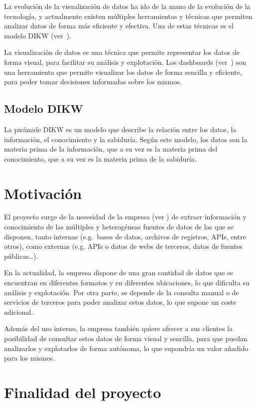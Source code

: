 La evolución de la visualización de datos ha ido de la mano de la evolución de la tecnología, y
actualmente existen múltiples herramientas y técnicas que permiten analizar datos de forma
más eficiente y efectiva. Una de estas técnicas es el modelo DIKW (ver~).

La visualización de datos es una técnica que permite representar los datos de forma visual, para
facilitar su análisis y explotación. Los dashboards (ver~) son una
herramienta que permite visualizar los datos de forma sencilla y eficiente, para poder tomar
decisiones informadas sobre los mismos.

\subsection{Modelo DIKW}\label{subsec:dikw}
La pirámide DIKW\cite{enwiki:1211227190} es un modelo que describe la relación entre los datos,
la información, el conocimiento y la sabiduría. Según este modelo, los datos son la materia prima
de la información, que a su vez es la materia prima del conocimiento, que a su vez es la materia
prima de la sabiduría.

\newpage{}

\section{Motivación}\label{sec:motivacion}
El proyecto surge de la necesidad de la empresa (ver ) de extraer información
y conocimiento de las múltiples y heterogéneas fuentes de datos de las que se disponen,
tanto internas (e.g.~bases de datos, archivos de registros, APIs, entre otros),
como externas (e.g. APIs o datos de webs de terceros, datos de fuentes públicas\ldots).

En la actualidad, la empresa dispone de una gran cantidad de datos que se encuentran en
diferentes formatos y en diferentes ubicaciones, lo que dificulta su análisis y explotación.
Por otra parte, se depende de la consulta manual o de servicios de terceros para poder analizar
estos datos, lo que supone un coste adicional.

Además del uso interno, la empresa también quiere ofrecer a sus clientes la posibilidad de
consultar estos datos de forma visual y sencilla, para que puedan analizarlos y explotarlos de
forma autónoma, lo que supondría un valor añadido para los mismos.

\section{Finalidad del proyecto}\label{sec:finalidad}
